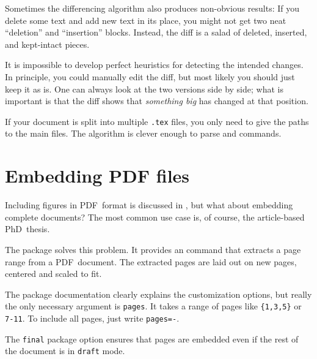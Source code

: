 \begin{gotcha}
Sometimes the differencing algorithm also produces non-obvious results:
If you delete some text and add new text in its place,
you might not get two neat ``deletion'' and ``insertion'' blocks.
Instead, the diff is a salad of deleted, inserted, and kept-intact pieces.

It is impossible to develop perfect heuristics for detecting the intended changes.
In principle, you could manually edit the diff,
but most likely you should just keep it as is.
One can always look at the two versions side by side;
what is important is that the diff shows that \emph{something big} has changed at that position.
\end{gotcha}

If your document is split into multiple \verb|.tex| files,
you only need to give the paths to the main files.
The algorithm is clever enough to parse \verb|| and \verb|| commands.



%
%
%
\section{Embedding PDF files}

Including figures in PDF~format is discussed in ,
but what about embedding complete documents?
The most common use case is, of course, the article-based PhD~thesis.

The  package solves this problem.
It provides an  command that extracts a page range from a PDF~document.
The extracted pages are laid out on new pages,
centered and scaled to fit.

The package documentation clearly explains the customization options,
but really the only necessary argument is \verb|pages|.
It takes a range of pages like \verb|{1,3,5}| or \verb|7-11|.
To include all pages, just write \verb|pages=-|.

\begin{ExampleCode}
\usepackage[final]{pdfpages}


\end{ExampleCode}
%
The \verb|final| package option ensures that pages are embedded
even if the rest of the document is in \verb|draft| mode.
